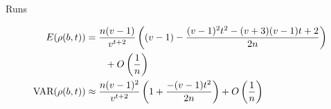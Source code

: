 	
\begin{frame}{Runs}

\begin{align*}
E(\rho(b,t)) &= \frac{n(v-1)}{v^{t+2}} \left((v-1) 
               - \frac{(v-1)^2t^{2} -(v+3)(v-1)t +2}{2n}\right) \\
  &\qquad + O\left (\frac{1}{n}\right)\\
  \mbox {VAR}(\rho(b,t)) &\approx \frac{n(v-1)^2}{v^{t+2}} \left(1 
     + \frac{-(v-1)t^2}{2n}\right) + O\left(\frac{1}{n}\right)
\end{align*}



\end{frame} 

